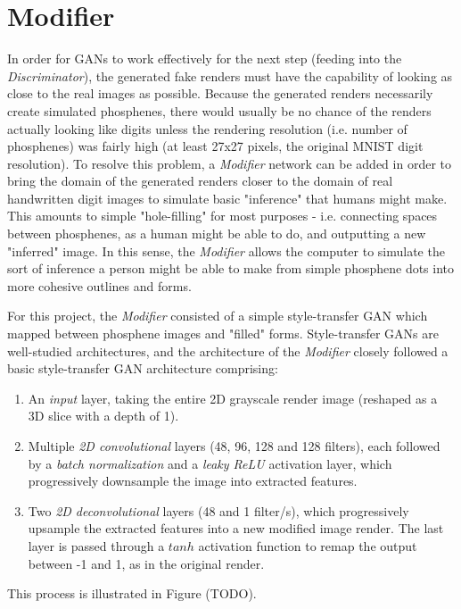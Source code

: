 \documentclass[a4paper,11pt,openany]{book}
\begin{document}
\section*{Modifier}
\label{sec:orgcb54eaa}

In order for GANs to work effectively for the next step (feeding into the \emph{Discriminator}), the generated fake renders must have the capability of looking as close to the real images as possible.
Because the generated renders necessarily create simulated phosphenes, there would usually be no chance of the renders actually looking like digits unless the rendering resolution (i.e. number of phosphenes) was fairly high (at least 27x27 pixels, the original MNIST digit resolution).
To resolve this problem, a \emph{Modifier} network can be added in order to bring the domain of the generated renders closer to the domain of real handwritten digit images to simulate basic "inference" that humans might make.
This amounts to simple "hole-filling" for most purposes - i.e. connecting spaces between phosphenes, as a human might be able to do, and outputting a new "inferred" image.
In this sense, the \emph{Modifier} allows the computer to simulate the sort of inference a person might be able to make from simple phosphene dots into more cohesive outlines and forms.

For this project, the \emph{Modifier} consisted of a simple style-transfer GAN which mapped between phosphene images and "filled" forms.
Style-transfer GANs are well-studied architectures, and the architecture of the \emph{Modifier} closely followed a basic style-transfer GAN architecture comprising:
\begin{enumerate}
\item An \emph{input} layer, taking the entire 2D grayscale render image (reshaped as a 3D slice with a depth of 1).
\item Multiple \emph{2D convolutional} layers (48, 96, 128 and 128 filters), each followed by a \emph{batch normalization} and a \emph{leaky ReLU} activation layer, which progressively downsample the image into extracted features.
\item Two \emph{2D deconvolutional} layers (48 and 1 filter/s), which progressively upsample the extracted features into a new modified image render.
The last layer is passed through a \(tanh\) activation function to remap the output between -1 and 1, as in the original render.
\end{enumerate}
This process is illustrated in Figure (TODO).
\end{document}

